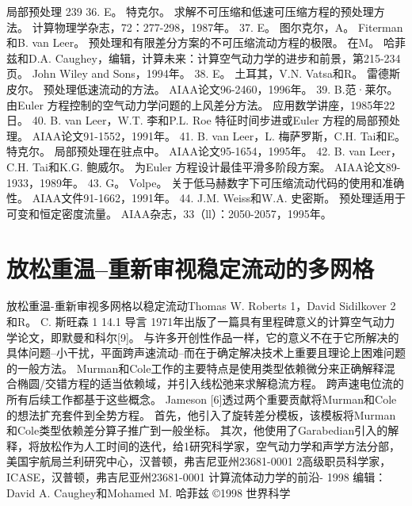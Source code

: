 \documentclass[UTF8,11pt,a4paper,openany,fontset=fandol]{ctexbook}
\begin{document}
局部预处理 239 36. E。 特克尔。 求解不可压缩和低速可压缩方程的预处理方法。 计算物理学杂志，72：277-298，1987年。 37. E。 图尔克尔，A。 Fiterman和B. van Leer。 预处理和有限差分方案的不可压缩流动方程的极限。 在M。 哈菲兹和D.A. Caughey，编辑，计算未来：计算空气动力学的进步和前景，第215-234页。 John Wiley and Sons，1994年。 38. E。 土耳其，V.N. Vatsa和R。 雷德斯皮尔。 预处理低速流动的方法。 AIAA论文96-2460，1996年。 39. B.范·莱尔。 由Euler 方程控制的空气动力学问题的上风差分方法。 应用数学讲座，1985年22日。 40. B. van Leer，W.T. 李和P.L. Roe 特征时间步进或Euler 方程的局部预处理。 AIAA论文91-1552，1991年。 41. B. van Leer，L. 梅萨罗斯，C.H. Tai和E。 特克尔。 局部预处理在驻点中。 AIAA论文95-1654，1995年。 42. B. van Leer，C.H. Tai和K.G. 鲍威尔。 为Euler 方程设计最佳平滑多阶段方案。 AIAA论文89-1933，1989年。 43. G。 Volpe。 关于低马赫数字下可压缩流动代码的使用和准确性。 AIAA文件91-1662，1991年。 44. J.M. Weiss和W.A. 史密斯。 预处理适用于可变和恒定密度流量。 AIAA杂志，33（ll）：2050-2057，1995年。

\clearpage
\chapter{放松重温--重新审视稳定流动的多网格}
放松重温-重新审视多网格以稳定流动Thomas W. Roberts 1，David Sidilkover 2和R。 C. 斯旺森 1 14.1 导言 1971年出版了一篇具有里程碑意义的计算空气动力学论文，即默曼和科尔[9]。 与许多开创性作品一样，它的意义不在于它所解决的具体问题--小干扰，平面跨声速流动--而在于确定解决技术上重要且理论上困难问题的一般方法。 Murman和Cole工作的主要特点是使用类型依赖微分来正确解释混合椭圆/交错方程的适当依赖域，并引入线松弛来求解稳流方程。 跨声速电位流的所有后续工作都基于这些概念。 Jameson [6]透过两个重要贡献将Murman和Cole的想法扩充套件到全势方程。 首先，他引入了旋转差分模板，该模板将Murman和Cole类型依赖差分算子推广到一般坐标。 其次，他使用了Garabedian引入的解释，将放松作为人工时间的迭代，给1研究科学家，空气动力学和声学方法分部，美国宇航局兰利研究中心，汉普顿，弗吉尼亚州23681-0001 2高级职员科学家，ICASE，汉普顿，弗吉尼亚州23681-0001 计算流体动力学的前沿- 1998 编辑：David A. Caughey和Mohamed M. 哈菲兹 ©1998 世界科学
\end{document}
